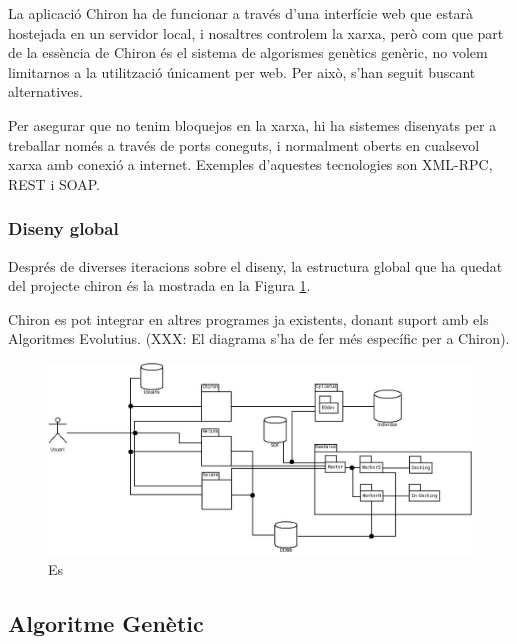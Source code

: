 La aplicació Chiron ha de funcionar a través d'una interfície web que estarà
hostejada en un servidor local, i nosaltres controlem la xarxa, però com que
part de la essència de Chiron és el sistema de algorismes genètics genèric, no
volem limitarnos a la utilització únicament per web.  Per això, s'han seguit
buscant alternatives.

Per asegurar que no tenim bloquejos en la xarxa, hi ha sistemes disenyats per a
treballar només a través de ports coneguts, i normalment oberts en cualsevol
xarxa amb conexió a internet.  Exemples d'aquestes tecnologies son XML-RPC, REST
i SOAP.

\subsubsection{Diseny global} %
\label{ssub:Diseny global}

Després de diverses iteracions sobre el diseny, la estructura global que ha
quedat del projecte chiron és la mostrada en la Figura \ref{fig:disenyChiron}.

Chiron es pot integrar en altres programes ja existents, donant suport amb els
Algoritmes Evolutius.  (XXX: El diagrama s'ha de fer més específic per a
Chiron).

\begin{figure}[h]
	\begin{center}
		\includegraphics[scale=0.4]{chiron/arquitectura_global_chiron.jpg}
	\end{center}
	\caption{Es}
	\label{fig:disenyChiron}
\end{figure}


\subsection{Algoritme Genètic} %
	\label{sub:Algoritme Genetic}

